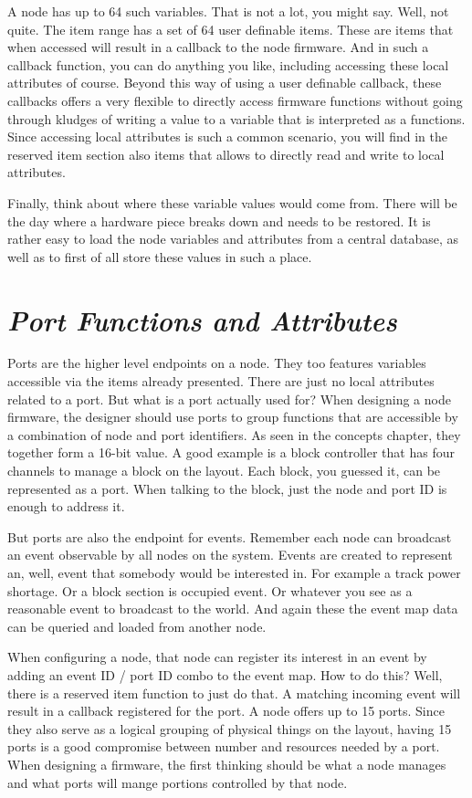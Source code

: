 A node has up to 64 such variables. That is not a lot, you might say. Well, not quite. The item range has a set of 64 user definable items. These are items that when accessed will result in a callback to the node firmware. And in such a callback function, you can do anything you like, including accessing these local attributes of course. Beyond this way of using a user definable callback, these callbacks offers a very flexible to directly access firmware functions without going through kludges of writing a value to a variable that is interpreted as a functions. Since accessing local attributes is such a common scenario, you will find in the reserved item section also items that allows to directly read and write to local attributes.

Finally, think about where these variable values would come from. There will be the day where a hardware piece breaks down and needs to be restored. It is rather easy to load the node variables and attributes from a central database, as well as to first of all store these values in such a place.

\section{\textit{Port Functions and Attributes}}

Ports are the higher level endpoints on a node. They too features variables accessible via the items already presented. There are just no local attributes related to a port. But what is a port actually used for? When designing a node firmware, the designer should use ports to group functions that are accessible by a combination of node and port identifiers. As seen in the concepts chapter, they together form a 16-bit value. A good example is a block controller that has four channels to manage a block on the layout. Each block, you guessed it, can be represented as a port. When talking to the block, just the node and port ID is enough to address it.

But ports are also the endpoint for events. Remember each node can broadcast an event observable by all nodes on the system. Events are created to represent an, well, event that somebody would be interested in. For example a track power shortage. Or a block section is occupied event. Or whatever you see as a reasonable event to broadcast to the world. And again these the event map data can be queried and loaded from another node.

When configuring a node, that node can register its interest in an event by adding an event ID / port ID combo to the event map. How to do this? Well, there is a reserved item function to just do that. A matching incoming event will result in a callback registered for the port. A node offers up to 15 ports. Since they also serve as a logical grouping of physical things on the layout, having 15 ports is a good compromise between number and resources needed by a port. When designing a firmware, the first thinking should be what a node manages and what ports will mange portions controlled by that node.

